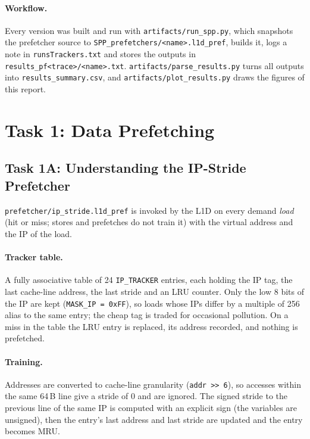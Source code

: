 \documentclass[11pt,a4paper]{article}
\theoremstyle{themethm}
\theoremstyle{themedef}
\theoremstyle{themeex}
\theoremstyle{themerem}
\begin{document}
\paragraph{Workflow.} Every version was built and run with
\texttt{artifacts/run\_spp.py}, which snapshots the prefetcher source to
\texttt{SPP\_prefetchers/<name>.l1d\_pref}, builds it, logs a note in
\texttt{runsTrackers.txt} and stores the outputs in
\texttt{results\_pf<trace>/<name>.txt}. \texttt{artifacts/parse\_results.py}
turns all outputs into \texttt{results\_summary.csv}, and
\texttt{artifacts/plot\_results.py} draws the figures of this report.

\section{Task 1: Data Prefetching}\label{sec:task1}

\subsection{Task 1A: Understanding the IP-Stride Prefetcher}\label{sec:task1a}
\texttt{prefetcher/ip\_stride.l1d\_pref} is invoked by the L1D on every demand
\emph{load} (hit or miss; stores and prefetches do not train it) with the
virtual address and the IP of the load.

\paragraph{Tracker table.} A fully associative table of 24 \texttt{IP\_TRACKER}
entries, each holding the IP tag, the last cache-line address, the last stride
and an LRU counter. Only the low 8 bits of the IP are kept
(\texttt{MASK\_IP = 0xFF}), so loads whose IPs differ by a multiple of 256
alias to the same entry; the cheap tag is traded for occasional pollution. On a
miss in the table the LRU entry is replaced, its address recorded, and nothing
is prefetched.

\paragraph{Training.} Addresses are converted to cache-line granularity
(\texttt{addr >> 6}), so accesses within the same 64\,B line give a stride of 0
and are ignored. The signed stride to the previous line of the same IP is
computed with an explicit sign (the variables are unsigned), then the entry's
last address and last stride are updated and the entry becomes MRU.
\end{document}
